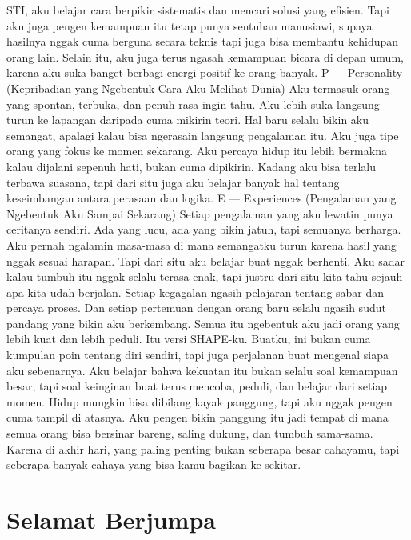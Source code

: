 \documentclass[
  letterpaper,
  DIV=11,
  numbers=noendperiod]{scrreprt}
\begin{document}
STI, aku belajar cara berpikir sistematis dan mencari solusi yang
efisien. Tapi aku juga pengen kemampuan itu tetap punya sentuhan
manusiawi, supaya hasilnya nggak cuma berguna secara teknis tapi juga
bisa membantu kehidupan orang lain. Selain itu, aku juga terus ngasah
kemampuan bicara di depan umum, karena aku suka banget berbagi energi
positif ke orang banyak. P --- Personality (Kepribadian yang Ngebentuk
Cara Aku Melihat Dunia) Aku termasuk orang yang spontan, terbuka, dan
penuh rasa ingin tahu. Aku lebih suka langsung turun ke lapangan
daripada cuma mikirin teori. Hal baru selalu bikin aku semangat, apalagi
kalau bisa ngerasain langsung pengalaman itu. Aku juga tipe orang yang
fokus ke momen sekarang. Aku percaya hidup itu lebih bermakna kalau
dijalani sepenuh hati, bukan cuma dipikirin. Kadang aku bisa terlalu
terbawa suasana, tapi dari situ juga aku belajar banyak hal tentang
keseimbangan antara perasaan dan logika. E --- Experiences (Pengalaman
yang Ngebentuk Aku Sampai Sekarang) Setiap pengalaman yang aku lewatin
punya ceritanya sendiri. Ada yang lucu, ada yang bikin jatuh, tapi
semuanya berharga. Aku pernah ngalamin masa-masa di mana semangatku
turun karena hasil yang nggak sesuai harapan. Tapi dari situ aku belajar
buat nggak berhenti. Aku sadar kalau tumbuh itu nggak selalu terasa
enak, tapi justru dari situ kita tahu sejauh apa kita udah berjalan.
Setiap kegagalan ngasih pelajaran tentang sabar dan percaya proses. Dan
setiap pertemuan dengan orang baru selalu ngasih sudut pandang yang
bikin aku berkembang. Semua itu ngebentuk aku jadi orang yang lebih kuat
dan lebih peduli. Itu versi SHAPE-ku. Buatku, ini bukan cuma kumpulan
poin tentang diri sendiri, tapi juga perjalanan buat mengenal siapa aku
sebenarnya. Aku belajar bahwa kekuatan itu bukan selalu soal kemampuan
besar, tapi soal keinginan buat terus mencoba, peduli, dan belajar dari
setiap momen. Hidup mungkin bisa dibilang kayak panggung, tapi aku nggak
pengen cuma tampil di atasnya. Aku pengen bikin panggung itu jadi tempat
di mana semua orang bisa bersinar bareng, saling dukung, dan tumbuh
sama-sama. Karena di akhir hari, yang paling penting bukan seberapa
besar cahayamu, tapi seberapa banyak cahaya yang bisa kamu bagikan ke
sekitar.


\chapter*{Selamat Berjumpa}\label{selamat-berjumpa-1}
\end{document}
